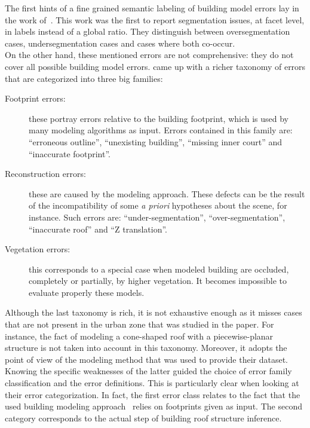             The first hints of a fine grained semantic labeling of building model errors lay in the work of~\textcite{rottensteiner2014results}.
            This work was the first to report segmentation issues, at facet level, in labels instead of a global ratio.
            They distinguish between oversegmentation cases, undersegmentation cases and cases where both co-occur.\\

            On the other hand, these mentioned errors are not comprehensive: they do not cover all possible building model errors.
            \textcite{michelin2013quality} came up with a richer taxonomy of errors that are categorized into three big families:
            \begin{description}
                \item[Footprint errors:] these portray errors relative to the building footprint, which is used by many modeling algorithms as input.
                        Errors contained in this family are: ``erroneous outline'', ``unexisting building'', ``missing inner court'' and ``inaccurate footprint''.
                \item[Reconstruction errors:] these are caused by the modeling approach.
                        These defects can be the result of the incompatibility of some \textit{a priori} hypotheses about the scene, for instance.
                        Such errors are: ``under-segmentation'', ``over-segmentation'', ``inaccurate roof'' and ``Z translation''.
                \item[Vegetation errors:] this corresponds to a special case when modeled building are occluded, completely or partially, by higher vegetation.
                        It becomes impossible to evaluate properly these models.
            \end{description}
            Although the last taxonomy is rich, it is not exhaustive enough as it misses cases that are not present in the urban zone that was studied in the paper.
            For instance, the fact of modeling a cone-shaped roof with a piecewise-planar structure is not taken into account in this taxonomy.
            Moreover, it adopts the point of view of the modeling method that was used to provide their dataset.
            Knowing the specific weaknesses of the latter guided the choice of error family classification and the error definitions.
            This is particularly clear when looking at their error categorization.
            In fact, the first error class relates to the fact that the used building modeling approach~\parencite{durupt2006automatic} relies on footprints given as input.
            The second category corresponds to the actual step of building roof structure inference.

